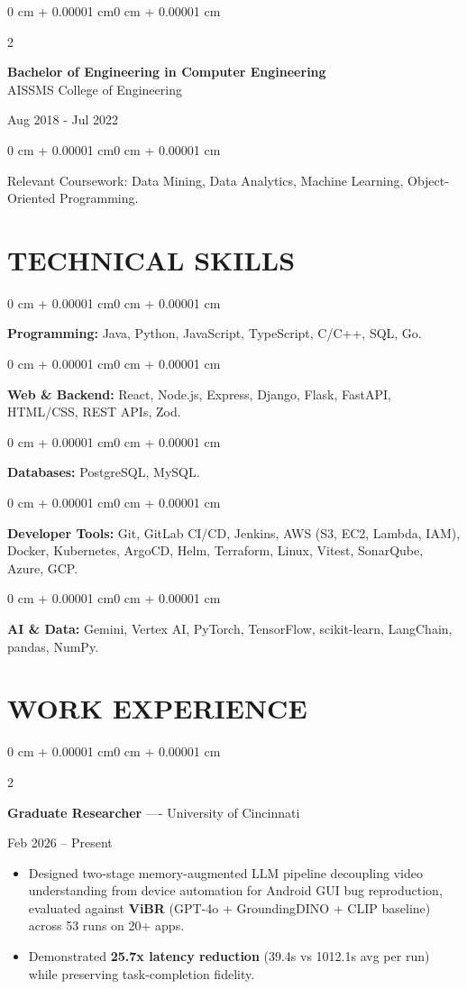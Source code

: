 \documentclass[10pt, letterpaper]{article}
\newenvironment{highlights}{
    \begin{itemize}[
        topsep=0.10 cm,
        parsep=0.06 cm,
        partopsep=0pt,
        itemsep=0.06 cm,
        leftmargin=12pt
    ]
}{
    \end{itemize}
}
\newenvironment{onecolentry}{
    \begin{adjustwidth}{0 cm + 0.00001 cm}{0 cm + 0.00001 cm}
}{
    \end{adjustwidth}
}
\newenvironment{twocolentry}[2][]{
    \onecolentry
    \def\secondColumn{#2}
    \setcolumnwidth{\fill, 4.5 cm}
    \begin{paracol}{2}
}{
    \switchcolumn \raggedleft \secondColumn
    \end{paracol}
    \endonecolentry
}
\begin{document}
\begin{twocolentry}{
    Aug 2018 - Jul 2022
}
    \textbf{Bachelor of Engineering in Computer Engineering} \\
    AISSMS College of Engineering
\end{twocolentry}
\begin{onecolentry}
Relevant Coursework: Data Mining, Data Analytics, Machine Learning, Object-Oriented Programming.
\end{onecolentry}
\section{TECHNICAL SKILLS}
\begin{onecolentry}
\textbf{Programming:} Java, Python, JavaScript, TypeScript, C/C++, SQL, Go.
\end{onecolentry}
\vspace{0.06 cm}
\begin{onecolentry}
\textbf{Web \& Backend:} React, Node.js, Express, Django, Flask, FastAPI, HTML/CSS, REST APIs, Zod.
\end{onecolentry}
\vspace{0.06 cm}
\begin{onecolentry}
\textbf{Databases:} PostgreSQL, MySQL.
\end{onecolentry}
\vspace{0.06 cm}
\begin{onecolentry}
\textbf{Developer Tools:} Git, GitLab CI/CD, Jenkins, AWS (S3, EC2, Lambda, IAM), Docker, Kubernetes, ArgoCD, Helm, Terraform, Linux, Vitest, SonarQube, Azure, GCP.
\end{onecolentry}
\vspace{0.06 cm}
\begin{onecolentry}
\textbf{AI \& Data:} Gemini, Vertex AI, PyTorch, TensorFlow, scikit-learn, LangChain, pandas, NumPy.
\end{onecolentry}

\section{WORK EXPERIENCE}
\begin{twocolentry}{Feb 2026 -- Present}
\textbf{Graduate Researcher} ---- University of Cincinnati
\end{twocolentry}
\begin{highlights}
  \item Designed two-stage memory-augmented LLM pipeline decoupling video understanding from device automation for Android GUI bug reproduction, evaluated against \textbf{ViBR} (GPT-4o + GroundingDINO + CLIP baseline) across 53 runs on 20+ apps.
  \item Demonstrated \textbf{25.7x latency reduction} (39.4s vs 1012.1s avg per run) while preserving task-completion fidelity.
\end{highlights}
\end{document}

